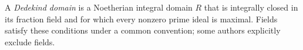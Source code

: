 
A \emph{Dedekind domain} is a Noetherian integral domain $R$ that is integrally closed in its fraction field and for which every nonzero prime ideal is maximal. Fields satisfy these conditions under a common convention; some authors explicitly exclude fields.
